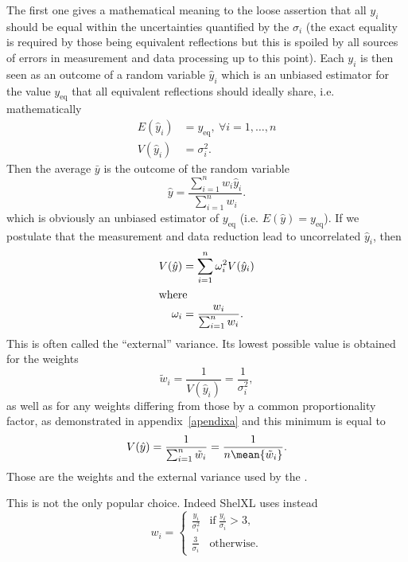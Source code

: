 \documentclass[11pt]{article}
\begin{document}
The first one gives a mathematical meaning to the loose assertion that all $y_i$ should be equal within the uncertainties quantified by the $\sigma_i$ (the exact equality is required by those being equivalent reflections but this is spoiled by all sources of errors in measurement and data processing up to this point). Each $y_i$ is then seen as an outcome of a random variable $\hat{y}_i$ which is an unbiased estimator for the value $y_{\text{eq}}$ that all equivalent reflections should ideally share, i.e. mathematically
\begin{align}
E(\hat{y}_i) &= y_{\text{eq}}, \ \forall i=1,\ldots,n\\
V(\hat{y}_i) &= \sigma_i^2 \nonumber.
\end{align}
Then the average $\bar{y}$ is the outcome of the random variable 
\begin{equation}
\hat{y} = \frac{\sum_{i=1}^n w_i \hat{y}_i}{\sum_{i=1}^n w_i} .
\end{equation}
which is obviously an unbiased estimator of $y_{\text{eq}}$ (i.e. $E(\hat{y}) = y_{\text{eq}}$). If we postulate that the measurement and data reduction lead to uncorrelated $\hat{y}_i$, then
\begin{align}
V(\hat{y}) &=  \sum_{i=1}^n \omega_i^2 V(\hat{y}_i)\\
\intertext{where}
\omega_i &= \frac{w_i}{\sum_{i=1}^n w_i}.
\label{eqn:externalvariance}
\end{align}
This is often called the ``external'' variance. Its lowest possible value is obtained for the weights
\begin{equation}
\tilde{w}_i = \frac{1}{V(\hat{y}_i)} = \frac{1}{\sigma_i^2},
\label{eqn:minimalvarianceweights}
\end{equation}
as well as for any weights differing from those by a common proportionality factor, as demonstrated in appendix~\ref{apendixa} and this minimum is equal to
\begin{equation}
V(\hat{y}) = \frac{1}{\sum_{i=1}^n \tilde{w}_i} = \frac{1}{n\mean{\tilde{w}_i}}.
\end{equation}
Those are the weights and the external variance used by the .

This is not the only popular choice. Indeed ShelXL \cite{SHELX:man97} uses instead
\begin{equation}
w_i = \begin{cases} 
\frac{y_i}{\sigma_i^2} & \text{if}\ \frac{y_i}{\sigma_i} > 3,\\
\frac{3}{\sigma_i} & \text{otherwise}.
\end{cases}
\end{equation}
\end{document}
